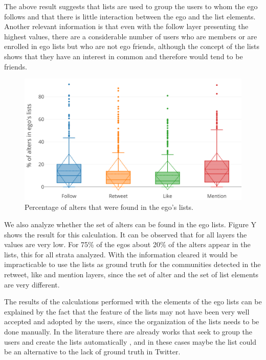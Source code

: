 The above result suggests that lists are used to group the users to whom the ego follows and that there is little interaction between the ego and the list elements. Another relevant information is that even with the follow layer presenting the highest values, there are a considerable number of users who are members or are enrolled in ego lists but who are not ego friends, although the concept of the lists shows that they have an interest in common and therefore would tend to be friends.


\begin{figure}[h!tb]
    \centering
    \includegraphics[width=1\textwidth]{fig/lists_stats/lists_intersection_over_alters_set.png}
    \caption{Percentage of alters that were found in the ego{'}s lists.}
    \label{fig:lists_lists_over_alters}
\end{figure}

We also analyze whether the set of alters can be found in the ego lists. Figure Y shows the result for this calculation. It can be observed that for all layers the values are very low. For 75\% of the egos about 20\% of the alters appear in the lists, this for all strata analyzed. With the information cleared it would be impracticable to use the lists as ground truth for the communities detected in the retweet, like and mention layers, since the set of alter and the set of list elements are very different.

The results of the calculations performed with the elements of the ego lists can be explained by the fact that the feature of the lists may not have been very well accepted and adopted by the users, since the organization of the lists needs to be done manually. In the literature there are already works that seek to group the users and create the lists automatically \cite{Wang2012,Wang2015}, and in these cases maybe the list could be an alternative to the lack of ground truth in Twitter.

